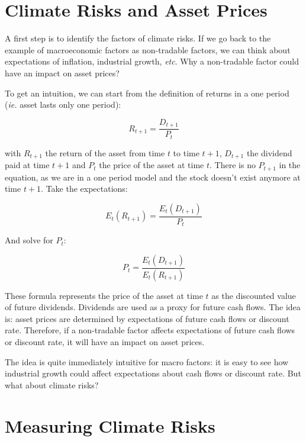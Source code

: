\section{Climate Risks and Asset Prices}

A first step is to identify the factors of climate risks.
If we go back to the example of macroeconomic factors 
as non-tradable factors, we can think about expectations 
of inflation, industrial growth, \textit{etc}. 
Why a non-tradable factor could have an impact on asset prices?

To get an intuition, we can start from the definition of 
returns in a one period  (\textit{ie.} asset lasts only one period):

\begin{equation}
    R_{t+1} = \frac{D_{t+1}}{P_t}
\end{equation}

with $R_{t+1}$ the return of the asset from time $t$ to time $t+1$, 
$D_{t+1}$ the dividend paid at time $t+1$ 
and $P_t$ the price of the asset at time $t$.
There is no $P_{t+1}$ in the equation, 
as we are in a one period model and 
the stock doesn't exist anymore at time $t+1$. Take the expectations:

\begin{equation}
    E_t(R_{t+1}) = \frac{E_t(D_{t+1})}{P_t}
\end{equation}

And solve for $P_t$:

\begin{equation}
    P_t = \frac{E_t(D_{t+1})}{E_t(R_{t+1})}
\end{equation}

These formula 
represents the price of the asset at time $t$ 
as the discounted value of future dividends.
Dividends are used as a proxy for future cash flows.
The idea is: asset prices are determined by
expectations of future cash flows or discount rate.
Therefore, if a non-tradable factor affects
expectations of future cash flows or discount rate,
it will have an impact on asset prices.

The idea is quite immediately intuitive for macro factors:
it is easy to see how industrial growth
could affect expectations about cash flows or discount rate. 
But what about climate risks?


\section{Measuring Climate Risks}

